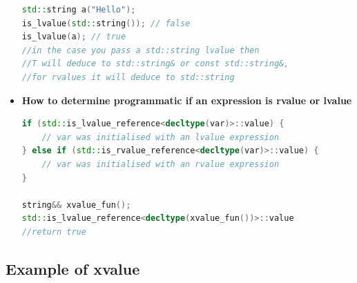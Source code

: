 \documentclass[a4paper,11pt,twoside]{book}
\begin{document}
\begin{itemize}
\begin{lstlisting}[frame=single, language=c++]
std::string a("Hello");
is_lvalue(std::string()); // false
is_lvalue(a); // true  
//in the case you pass a std::string lvalue then 
//T will deduce to std::string& or const std::string&,
//for rvalues it will deduce to std::string
\end{lstlisting}

\item \textbf{How to determine programmatic if an expression is rvalue or lvalue}
\begin{lstlisting}[frame=single, language=c++]
if (std::is_lvalue_reference<decltype(var)>::value) {
	// var was initialised with an lvalue expression
} else if (std::is_rvalue_reference<decltype(var)>::value) {
	// var was initialised with an rvalue expression
}

string&& xvalue_fun();
std::is_lvalue_reference<decltype(xvalue_fun())>::value
//return true
\end{lstlisting}

\end{itemize}

\subsection{Example of xvalue}
\end{document}
